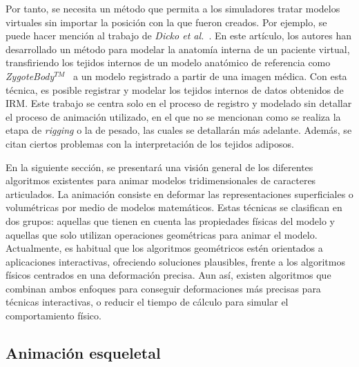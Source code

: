 Por tanto, se necesita un método que permita a los simuladores tratar modelos virtuales sin importar la posición con la que fueron creados. %
Por ejemplo, se puede hacer mención al trabajo de  \emph{Dicko et al.}~\cite{Ali2013}.  En este artículo, los autores han desarrollado un método para modelar la anatomía interna de un paciente virtual, transfiriendo los tejidos internos de un modelo anatómico de referencia como \emph{ZygoteBody}$^{TM}$~\cite{kelc2012zygote} a un modelo registrado a partir de una imagen médica. Con esta técnica, es posible registrar y modelar los tejidos internos de datos obtenidos de \ac{IRM}. Este trabajo se centra solo en el proceso de registro y modelado sin detallar el proceso de animación utilizado, en el que no se mencionan como se realiza la etapa de \emph{rigging} o la de pesado, las cuales se detallarán más adelante. Además, se citan ciertos problemas con la interpretación de los tejidos adiposos.   


En la siguiente sección, se presentará una visión general de los diferentes algoritmos existentes para animar modelos tridimensionales de caracteres articulados. La animación consiste en deformar las representaciones superficiales 
o volumétricas por medio de modelos matemáticos. Estas técnicas se clasifican en dos grupos: aquellas que tienen en cuenta las propiedades físicas del modelo y aquellas que solo utilizan operaciones geométricas para animar el modelo. Actualmente, es habitual que los algoritmos geométricos estén orientados a aplicaciones interactivas, ofreciendo soluciones plausibles, %
frente a los algoritmos físicos centrados en una deformación precisa. Aun así, existen algoritmos que combinan ambos enfoques para conseguir deformaciones más precisas para técnicas interactivas, o reducir el tiempo de cálculo para simular el comportamiento físico. 


\subsection{Animación esqueletal}
\label{art:animation}
\label{art:virtualskel}

